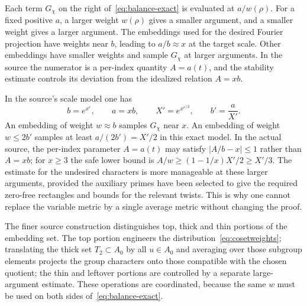 \documentclass[11pt,openany,oneside]{scrbook}
\theoremstyle{definition}
\theoremstyle{remark}
\newcommand{\eps}{\varepsilon}
\begin{document}
Each term $G_\chi$ on the right of~\eqref{eq:balance-exact} is evaluated at $a/w(\rho)$. For a fixed positive $a$, a larger weight $w(\rho)$ gives a smaller argument, and a smaller weight gives a larger argument. The embeddings used for the desired Fourier projection have weights near $b$, leading to $a/b\approx x$ at the target scale. Other embeddings have smaller weights and sample $G_\chi$ at larger arguments. In the source the numerator is a per-index quantity $A=a(t)$, and the stability estimate controls its deviation from the idealized relation $A=xb$.

In the source's scale model one has
\[
b=e^{x^\eps},\qquad a=xb,\qquad X'=e^{x^{\eps/3}},
\qquad b'=\frac{a}{X'}.
\]
An embedding of weight $w\approx b$ samples $G_\chi$ near $x$.  An embedding of weight $w\le2b'$ samples at least $a/(2b')=X'/2$ in this exact model. In the actual source, the per-index parameter $A=a(t)$ may satisfy $|A/b-x|\le1$ rather than $A=xb$; for $x\ge3$ the safe lower bound is $A/w\ge (1-1/x)X'/2\ge X'/3$. The estimate for the undesired characters is more manageable at these larger arguments, provided the auxiliary primes have been selected to give the required zero-free rectangles and bounds for the relevant twists.  This is why one cannot replace the variable metric by a single average metric without changing the proof.

The finer source construction distinguishes top, thick and thin portions of the embedding set.  The top portion engineers the distribution~\eqref{eq:cosetweights}; translating the thick set $T_2\subset A_0$ by all $u\in A_0$ and averaging over those subgroup elements projects the group characters onto those compatible with the chosen quotient; the thin and leftover portions are controlled by a separate large-argument estimate.  These operations are coordinated, because the same $w$ must be used on both sides of~\eqref{eq:balance-exact}.
\end{document}
